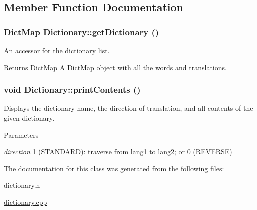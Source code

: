 \subsection{Member Function Documentation}
\hypertarget{classDictionary_a9696c9da75da8f8bfd1a1e2ff071c343}{
\subsubsection[{getDictionary}]{\setlength{\rightskip}{0pt plus 5cm}DictMap Dictionary::getDictionary ()}}
\label{classDictionary_a9696c9da75da8f8bfd1a1e2ff071c343}
An accessor for the dictionary list. \begin{DoxyReturn}{Returns}
DictMap A DictMap object with all the words and translations. 
\end{DoxyReturn}
\hypertarget{classDictionary_a2dbee36571908c93d96cfe885f25272e}{
\subsubsection[{printContents}]{\setlength{\rightskip}{0pt plus 5cm}void Dictionary::printContents ()}}
\label{classDictionary_a2dbee36571908c93d96cfe885f25272e}
Displays the dictionary name, the direction of translation, and all contents of the given dictionary. 
\begin{DoxyParams}{Parameters}
\item[{\em direction}]1 (STANDARD): traverse from \hyperlink{structlang1}{lang1} to \hyperlink{structlang2}{lang2}; or 0 (REVERSE) \end{DoxyParams}


The documentation for this class was generated from the following files:\begin{DoxyCompactItemize}
\item 
dictionary.h\item 
\hyperlink{dictionary_8cpp}{dictionary.cpp}\end{DoxyCompactItemize}
